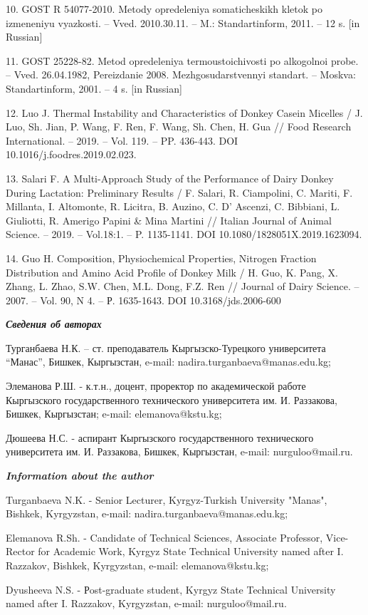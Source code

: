 \begin{noparindent}
10. GOST R 54077-2010. Metody opredeleniya somaticheskikh kletok po
izmeneniyu vyazkosti. -- Vved. 2010.30.11. -- M.: Standartinform, 2011.
-- 12 s. {[}in Russian{]}

11. GOST 25228-82. Metod opredeleniya termoustoichivosti po
alkogol\textquotesingle noi probe. -- Vved. 26.04.1982, Pereizdanie
2008. Mezhgosudarstvennyi standart. -- Moskva: Standartinform, 2001. --
4 s. {[}in Russian{]}

12. Luo J. Thermal Instability and Characteristics of Donkey Casein
Micelles / J. Luo, Sh. Jian, P. Wang, F. Ren, F. Wang, Sh. Chen, H. Gua
// Food Research International. -- 2019. -- Vol. 119. -- PP. 436-443.
DOI 10.1016/j.foodres.2019.02.023.

13. Salari F. A Multi-Approach Study of the Performance of Dairy Donkey
During Lactation: Preliminary Results / F. Salari, R. Ciampolini, C.
Mariti, F. Millanta, I. Altomonte, R. Licitra, B. Auzino, C. D' Ascenzi,
C. Bibbiani, L. Giuliotti, R. Amerigo Papini \& Mina Martini // Italian
Journal of Animal Science. -- 2019. -- Vol.18:1. -- P. 1135-1141. DOI
10.1080/1828051X.2019.1623094.

14. Guo H. Composition, Physiochemical Properties, Nitrogen Fraction
Distribution and Amino Acid Profile of Donkey Milk / H. Guo, K. Pang, X.
Zhang, L. Zhao, S.W. Chen, M.L. Dong, F.Z. Ren // Journal of Dairy
Science. -- 2007. -- Vol. 90, N 4. -- Р. 1635-1643. DOI
10.3168/jds.2006-600
\end{noparindent}

\emph{{\bfseries Сведения об авторах}}

\begin{noparindent}
Турганбаева Н.К. -- ст. преподаватель Кыргызско-Турецкого университета
``Манас'', Бишкек, Кыргызстан, e-mail: nadira.turganbaeva@manas.edu.kg;

Элеманова Р.Ш. - к.т.н., доцент, проректор по академической работе
Кыргызского государственного технического университета им. И. Раззакова,
Бишкек, Кыргызстан; e-mail: elemanova@kstu.kg;

Дюшеева Н.С. - аспирант Кыргызского государственного технического
университета им. И. Раззакова, Бишкек, Кыргызстан, e-mail:
nurguloo@mail.ru.
\end{noparindent}

\emph{{\bfseries Information about the author}}

\begin{noparindent}
Turganbaeva N.K. - Senior Lecturer, Kyrgyz-Turkish University "Manas",
Bishkek, Kyrgyzstan, e-mail: nadira.turganbaeva@manas.edu.kg;

Elemanova R.Sh. - Candidate of Technical Sciences, Associate Professor,
Vice-Rector for Academic Work, Kyrgyz State Technical University named
after I. Razzakov, Bishkek, Kyrgyzstan, e-mail: elemanova@kstu.kg;

Dyusheeva N.S. - Рost-graduate student, Kyrgyz State Technical
University named after I. Razzakov, Kyrgyzstan, e-mail:
nurguloo@mail.ru.
\end{noparindent}
